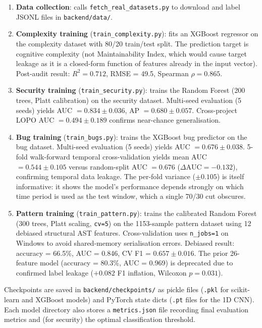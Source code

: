 \documentclass[12pt, oneside]{report}
\begin{document}
\begin{enumerate}
  \item \textbf{Data collection}: calls \texttt{fetch\_real\_datasets.py} to download
    and label JSONL files in \texttt{backend/data/}.
  \item \textbf{Complexity training} (\texttt{train\_complexity.py}): fits an XGBoost
    regressor on the complexity dataset with 80/20 train/test split. The prediction
    target is cognitive complexity (not Maintainability Index, which would cause target
    leakage as it is a closed-form function of features already in the input vector).
    Post-audit result: $R^2 = 0.712$, RMSE = 49.5, Spearman $\rho = 0.865$.
  \item \textbf{Security training} (\texttt{train\_security.py}): trains the Random Forest
    (200 trees, Platt calibration) on the security dataset. Multi-seed evaluation
    (5 seeds) yields AUC $= 0.834 \pm 0.036$, AP $= 0.680 \pm 0.057$.
    Cross-project LOPO AUC $= 0.494 \pm 0.189$ confirms near-chance generalisation.
  \item \textbf{Bug training} (\texttt{train\_bugs.py}): trains the XGBoost bug predictor
    on the bug dataset. Multi-seed evaluation (5 seeds) yields AUC $= 0.676 \pm 0.038$.
    5-fold walk-forward temporal cross-validation yields mean AUC $= 0.544 \pm 0.105$
    versus random-split AUC $= 0.676$ ($\Delta\text{AUC} = -0.132$), confirming
    temporal data leakage. The per-fold variance ($\pm0.105$) is itself informative:
    it shows the model's performance depends strongly on which time period is used
    as the test window, which a single 70/30 cut obscures.
  \item \textbf{Pattern training} (\texttt{train\_pattern.py}): trains the calibrated
    Random Forest (300 trees, Platt scaling, \texttt{cv=5}) on the 1153-sample pattern
    dataset using 12 debiased structural AST features. Cross-validation uses
    \texttt{n\_jobs=1} on Windows to avoid shared-memory serialisation errors.
    Debiased result: accuracy = 66.5\%, AUC = 0.846, CV F1 = $0.657 \pm 0.016$.
    The prior 26-feature model (accuracy = 80.3\%, AUC = 0.969) is deprecated due
    to confirmed label leakage ($+0.082$ F1 inflation, Wilcoxon $p=0.031$).
\end{enumerate}

Checkpoints are saved in \texttt{backend/checkpoints/} as pickle files (\texttt{.pkl}
for scikit-learn and XGBoost models) and PyTorch state dicts (\texttt{.pt} files for the
1D CNN). Each model directory also stores a \texttt{metrics.json} file recording final
evaluation metrics and (for security) the optimal classification threshold.
\end{document}
